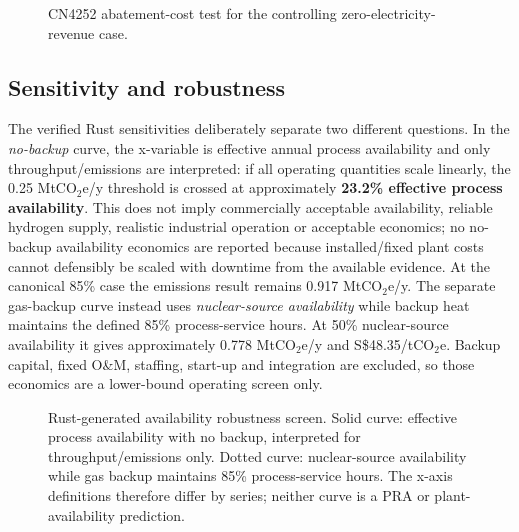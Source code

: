 \begin{figure}[htbp]\centering
{}
\caption{CN4252 abatement-cost test for the controlling zero-electricity-revenue case.}
\label{fig:cost-threshold}
\end{figure}

\subsection{Sensitivity and robustness}
The verified Rust sensitivities deliberately separate two different questions.  In the \emph{no-backup} curve, the x-variable is effective annual process availability and only throughput/emissions are interpreted: if all operating quantities scale linearly, the 0.25 MtCO$_2$e/y threshold is crossed at approximately \textbf{23.2\% effective process availability}.  This does not imply commercially acceptable availability, reliable hydrogen supply, realistic industrial operation or acceptable economics; no no-backup availability economics are reported because installed/fixed plant costs cannot defensibly be scaled with downtime from the available evidence.  At the canonical 85\% case the emissions result remains 0.917 MtCO$_2$e/y.  The separate gas-backup curve instead uses \emph{nuclear-source availability} while backup heat maintains the defined 85\% process-service hours.  At 50\% nuclear-source availability it gives approximately 0.778 MtCO$_2$e/y and S\$48.35/tCO$_2$e.  Backup capital, fixed O\&M, staffing, start-up and integration are excluded, so those economics are a lower-bound operating screen only.

\begin{figure}[htbp]\centering

\caption{Rust-generated availability robustness screen.  Solid curve: effective process availability with no backup, interpreted for throughput/emissions only.  Dotted curve: nuclear-source availability while gas backup maintains 85\% process-service hours.  The x-axis definitions therefore differ by series; neither curve is a PRA or plant-availability prediction.}
\label{fig:availability-robustness}
\end{figure}

